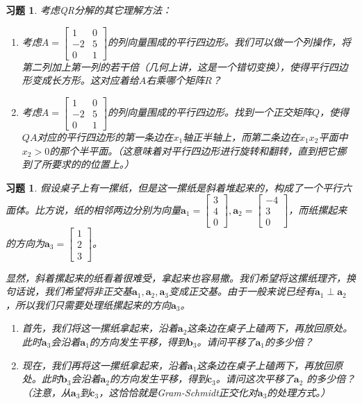 \documentclass[UTF8]{ctexart}
\newtheorem{ex}[thm]{习题}
\begin{document}
\begin{ex}
考虑QR分解的其它理解方法：
\begin{enumerate}
\item 考虑$A=\begin{bmatrix}1&0\\-2&5\\0&1\end{bmatrix}$的列向量围成的平行四边形。我们可以做一个列操作，将第二列加上第一列的若干倍（几何上讲，这是一个错切变换），使得平行四边形变成长方形。这对应着给$A$右乘哪个矩阵$R$？
\item 考虑$A=\begin{bmatrix}1&0\\-2&5\\0&1\end{bmatrix}$的列向量围成的平行四边形。找到一个正交矩阵$Q$，使得$QA$对应的平行四边形的第一条边在$x_1$轴正半轴上，而第二条边在$x_1x_2$平面中$x_2>0$的那个半平面。（这意味着对平行四边形进行旋转和翻转，直到把它挪到了所要求的的位置上。）
\end{enumerate}
\end{ex}




\begin{ex}
假设桌子上有一摞纸，但是这一摞纸是斜着堆起来的，构成了一个平行六面体。比方说，纸的相邻两边分别为向量$\bm a_1=\begin{bmatrix}3\\4\\0\end{bmatrix},\bm a_2=\begin{bmatrix}-4\\3\\0\end{bmatrix}$，而纸摞起来的方向为$\bm a_3=\begin{bmatrix}1\\2\\3\end{bmatrix}$。

显然，斜着摞起来的纸看着很难受，拿起来也容易撒。我们希望将这摞纸理齐，换句话说，我们希望将非正交基$\bm a_1,\bm a_2,\bm a_3$变成正交基。由于一般来说已经有$\bm a_1\perp\bm a_2$，所以我们只需要处理纸摞起来的方向$\bm a_3$。
\begin{enumerate}
\item 首先，我们将这一摞纸拿起来，沿着$\bm a_2$这条边在桌子上磕两下，再放回原处。此时$\bm a_3$会沿着$\bm a_1$的方向发生平移，得到$\bm b_3$。请问平移了$\bm a_1$的多少倍？
\item 现在，我们再将这一摞纸拿起来，沿着$\bm a_1$这条边在桌子上磕两下，再放回原处。此时$\bm b_3$会沿着$\bm a_2$的方向发生平移，得到$\bm c_3$。请问这次平移了$\bm a_2$ 的多少倍？（注意，从$\bm a_3$到$\bm c_3$，这恰恰就是Gram-Schmidt正交化对$\bm a_3$的处理方式。）
\end{enumerate}
\end{ex}
\end{document}
